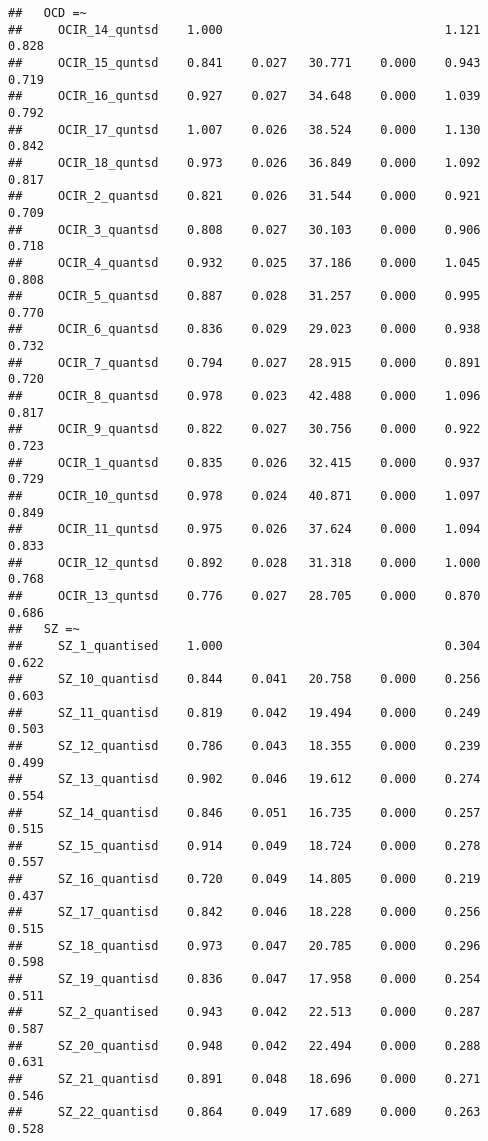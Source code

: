 \documentclass[]{article}
\begin{document}
\begin{verbatim}
##   OCD =~                                                                
##     OCIR_14_quntsd    1.000                               1.121    0.828
##     OCIR_15_quntsd    0.841    0.027   30.771    0.000    0.943    0.719
##     OCIR_16_quntsd    0.927    0.027   34.648    0.000    1.039    0.792
##     OCIR_17_quntsd    1.007    0.026   38.524    0.000    1.130    0.842
##     OCIR_18_quntsd    0.973    0.026   36.849    0.000    1.092    0.817
##     OCIR_2_quantsd    0.821    0.026   31.544    0.000    0.921    0.709
##     OCIR_3_quantsd    0.808    0.027   30.103    0.000    0.906    0.718
##     OCIR_4_quantsd    0.932    0.025   37.186    0.000    1.045    0.808
##     OCIR_5_quantsd    0.887    0.028   31.257    0.000    0.995    0.770
##     OCIR_6_quantsd    0.836    0.029   29.023    0.000    0.938    0.732
##     OCIR_7_quantsd    0.794    0.027   28.915    0.000    0.891    0.720
##     OCIR_8_quantsd    0.978    0.023   42.488    0.000    1.096    0.817
##     OCIR_9_quantsd    0.822    0.027   30.756    0.000    0.922    0.723
##     OCIR_1_quantsd    0.835    0.026   32.415    0.000    0.937    0.729
##     OCIR_10_quntsd    0.978    0.024   40.871    0.000    1.097    0.849
##     OCIR_11_quntsd    0.975    0.026   37.624    0.000    1.094    0.833
##     OCIR_12_quntsd    0.892    0.028   31.318    0.000    1.000    0.768
##     OCIR_13_quntsd    0.776    0.027   28.705    0.000    0.870    0.686
##   SZ =~                                                                 
##     SZ_1_quantised    1.000                               0.304    0.622
##     SZ_10_quantisd    0.844    0.041   20.758    0.000    0.256    0.603
##     SZ_11_quantisd    0.819    0.042   19.494    0.000    0.249    0.503
##     SZ_12_quantisd    0.786    0.043   18.355    0.000    0.239    0.499
##     SZ_13_quantisd    0.902    0.046   19.612    0.000    0.274    0.554
##     SZ_14_quantisd    0.846    0.051   16.735    0.000    0.257    0.515
##     SZ_15_quantisd    0.914    0.049   18.724    0.000    0.278    0.557
##     SZ_16_quantisd    0.720    0.049   14.805    0.000    0.219    0.437
##     SZ_17_quantisd    0.842    0.046   18.228    0.000    0.256    0.515
##     SZ_18_quantisd    0.973    0.047   20.785    0.000    0.296    0.598
##     SZ_19_quantisd    0.836    0.047   17.958    0.000    0.254    0.511
##     SZ_2_quantised    0.943    0.042   22.513    0.000    0.287    0.587
##     SZ_20_quantisd    0.948    0.042   22.494    0.000    0.288    0.631
##     SZ_21_quantisd    0.891    0.048   18.696    0.000    0.271    0.546
##     SZ_22_quantisd    0.864    0.049   17.689    0.000    0.263    0.528

\end{verbatim}
\end{document}
